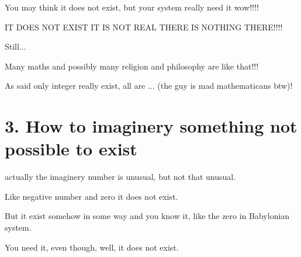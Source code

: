 \documentclass[letterpaper,10pt,english]{jupyterBook}
\begin{document}
\begin{sphinxVerbatim}[commandchars=\\\{\}]
You may think it does not exist, but your system really need it wow!!!!

IT DOES NOT EXIST
IT IS NOT REAL 
THERE IS NOTHING THERE!!!!

Still...
\end{sphinxVerbatim}

\begin{sphinxVerbatim}[commandchars=\\\{\}]
Many maths and possibly many religion and philosophy are like that!!! 

As said only integer really exist, all are ... (the guy is mad mathematicans btw)!
\end{sphinxVerbatim}

\sphinxstepscope


\chapter{3. How to imaginery something not possible to exist}
\label{\detokenize{MacTwgssA3-imgNo:how-to-imaginery-something-not-possible-to-exist}}\label{\detokenize{MacTwgssA3-imgNo::doc}}
\begin{sphinxVerbatim}[commandchars=\\\{\}]
actually the imaginery number is unusual, but not that unusual. 

Like negative number and zero it does not exist.  

But it exist somehow in some way and you know it, like the zero in Babylonian system.  

You need it, even though, well, it does not exist.
\end{sphinxVerbatim}
\end{document}
